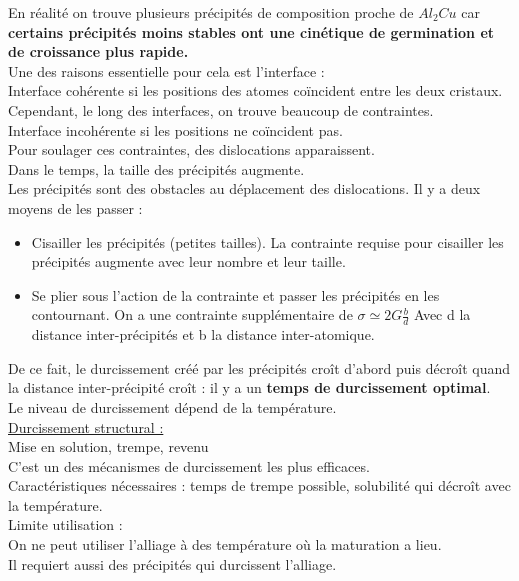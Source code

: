 \documentclass[../main.tex]{subfiles}
\begin{document}
En réalité on trouve plusieurs précipités de composition proche de $Al_2Cu$ car \textbf{certains précipités moins stables ont une cinétique de germination et de croissance plus rapide.}\\
Une des raisons essentielle pour cela est l'interface : \\
Interface cohérente si les positions des atomes coïncident entre les deux cristaux. Cependant, le long des interfaces, on trouve beaucoup de contraintes.\\
Interface incohérente si les positions ne coïncident pas.\\
Pour soulager ces contraintes, des dislocations apparaissent.\\

\warning Dans le temps, la taille des précipités augmente.\\

Les précipités sont des obstacles au déplacement des dislocations. Il y a deux moyens de les passer :\\
\begin{itemize}
    \item Cisailler les précipités (petites tailles). La contrainte requise pour cisailler les précipités augmente avec leur nombre et leur taille.\\
    \item Se plier sous l'action de la contrainte et passer les précipités en les contournant. On a une contrainte supplémentaire de $\sigma \simeq 2 G\frac{b}{d}$ Avec d la distance inter-précipités et b la distance inter-atomique.\\
\end{itemize}
De ce fait, le durcissement créé par les précipités croît d'abord puis décroît quand la distance inter-précipité croît : il y a un \textbf{temps de durcissement optimal}.\\
Le niveau de durcissement dépend de la température.\\

\quad \underline{Durcissement structural :}\\
Mise en solution, trempe, revenu\\
C'est un des mécanismes de durcissement les plus efficaces.\\
Caractéristiques nécessaires : temps de trempe possible, solubilité qui décroît avec la température.\\
Limite utilisation : \\
On ne peut utiliser l'alliage à des température où la maturation a lieu.\\
Il requiert aussi des précipités qui durcissent l'alliage.\\
\end{document}
